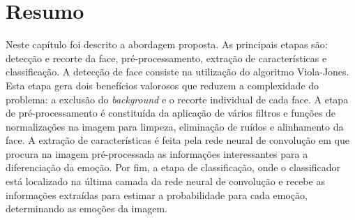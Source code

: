\section{Resumo}\label{sec:considfi}
Neste capítulo foi descrito a abordagem proposta. As principais etapas são: detecção e recorte da face, pré-processamento, extração de características e classificação. A detecção de face consiste na utilização do algoritmo Viola-Jones. Esta etapa gera dois benefícios valorosos que reduzem a complexidade do problema: a exclusão do \textit{background} e o recorte individual de cada face. A etapa de pré-processamento é constituída da aplicação de vários filtros e funções de normalizações na imagem para limpeza, eliminação de ruídos e alinhamento da face. A extração de características é feita pela rede neural de convolução em que procura na imagem pré-processada as informações interessantes para a diferenciação da emoção. Por fim, a etapa de classificação, onde o classificador está localizado na última camada da rede neural de convolução e recebe as informações extraídas para estimar a probabilidade para cada emoção, determinando as emoções da imagem.      